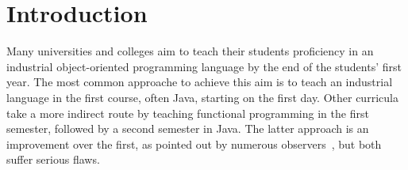 \documentclass[submission,copyright]{eptcs}
\title{\thetitle}
\author{Sam Tobin-Hochstadt \quad\qquad David Van Horn
\institute{Northeastern University\\
Boston, Massachusetts, USA}
\email{\{samth,dvanhorn\}@ccs.neu.edu}
}
\begin{document}
\maketitle

\begin{abstract}
We propose a bridge between functional and object-oriented programming
in the first-year curriculum.  Traditionally, curricula that begin
with functional programming transition to a professional, usually
object-oriented, language in the second course.  This transition poses
obstacles for students, and often results in confusing the details of
development environments, syntax, and libraries with the fundamentals
of OO programming that the course should focus on.  Instead, we
propose to begin the second course with a sequence of custom teaching
languages which minimize the transition from the first course, and
allow students to focus on core ideas.  After working through the
sequence of pedagogical languages, we then transition to Java, at
which point students have a strong command of the basic principles.
We have 3 years of experience with this course, with notable success.
\end{abstract}

\section{Introduction}
\label{sec:intro}

Many universities and colleges aim to teach their students proficiency
in an industrial object-oriented programming language by the end of
the students' first year.  The most common approache to achieve this
aim is to teach an industrial language in the first course, often
Java, starting on the first day.  Other curricula take a more indirect
route by teaching functional programming in the first semester,
followed by a second semester in Java.  The latter approach is an
improvement over the first, as pointed out by numerous
observers~\cite{dvanhorn:Felleisen2004Structure, local:spolsky}, but
both suffer serious flaws.
\end{document}
